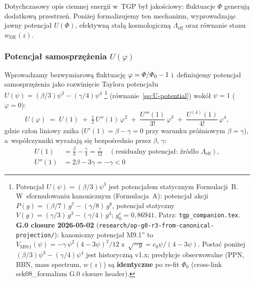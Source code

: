 Dotychczasowy opis ciemnej energii w~TGP by\l{} jako\'sciowy:
fluktuacje $\Phi$ generuj\k{a} dodatkow\k{a} przestrze\'n.
Poni\.zej formalizujemy ten mechanizm, wyprowadzaj\k{a}c
jawny potencja\l{} $U(\Phi)$, efektywn\k{a} sta\l{}\k{a}
kosmologiczn\k{a} $\Lambda_{\mathrm{eff}}$ oraz r\'ownanie
stanu $w_{\mathrm{DE}}(z)$.

\subsubsection{Potencja\l{} samosprz\k{e}\.zenia $U(\varphi)$}

\begin{definition}\label{def:U-DE}
Wprowadzamy bezwymiarow\k{a} fluktuacj\k{e}
$\varphi = \varPhi/\varPhi_0 - 1$ i~definiujemy potencja\l{}
samosprz\k{e}\.zenia jako rozwinięcie Taylora potencja\l{}u
$U(\psi) = (\beta/3)\psi^3 - (\gamma/4)\psi^4$%
\footnote{Potencja\l{} $U(\psi) = (\beta/3)\psi^3$ jest potencja\l{}em
statycznym Formulacji~B. W~sformu\l{}owaniu kanonicznym (Formulacja~A):
potencja\l{} akcji $P(g) = (\beta/7)\,g^7 - (\gamma/8)\,g^8$,
potencja\l{} statyczny $V(g) = (\gamma/3)\,g^3 - (\gamma/4)\,g^4$;
$g_0^e = 0{,}86941$. Patrz: \texttt{tgp\_companion.tex}.
\textbf{G.0 closure 2026-05-02} (\texttt{research/op-g0-r3-from-canonical-projection/}):
kanoniczny potencja\l{} M9.1'' to $V_{\mathrm{M911}}(\psi) =
-\gamma\,\psi^2(4-3\psi)^2/12$ z~$\sqrt{-g} = c_0\psi/(4-3\psi)$.
Posta\'c poni\.zej $(\beta/3)\psi^3 - (\gamma/4)\psi^4$ jest historyczn\k{a}
v1.x; predykcje obserwowalne (PPN, BBN, mass spectrum, $w(z)$) s\k{a}
\textbf{identyczne} po re-fit $\Phi_0$ (cross-link sek08\_formalizm
G.0 closure header).}
(r\'ownanie~\ref{eq:U-potential}) wok\'o\l{}
$\psi = 1$ ($\varphi = 0$):
\begin{equation}\label{eq:U-phi-def}
  \boxed{
    U(\varphi)
    \;=\; U(1) \;+\; \tfrac{1}{2}\,U''(1)\,\varphi^2
    \;+\; \frac{U'''(1)}{3!}\,\varphi^3
    \;+\; \frac{U^{(4)}(1)}{4!}\,\varphi^4,
  }
\end{equation}
gdzie cz\l{}on liniowy znika ($U'(1) = \beta - \gamma = 0$
przy warunku pr\'o\.zniowym $\beta = \gamma$),
a~wsp\'o\l{}czynniki wyra\.zaj\k{a} si\k{e} bezpo\'srednio
przez $\beta$, $\gamma$:
\begin{align}
  U(1) &= \frac{\beta}{3} - \frac{\gamma}{4}
    = \frac{\gamma}{12}
    \quad (\text{residualny potencja\l{}: \'zr\'od\l{}o }\Lambda_{\mathrm{eff}}),
    \label{eq:U1-from-bg} \\[3pt]
  U''(1) &= 2\beta - 3\gamma = -\gamma < 0

\end{align}
\end{definition}
